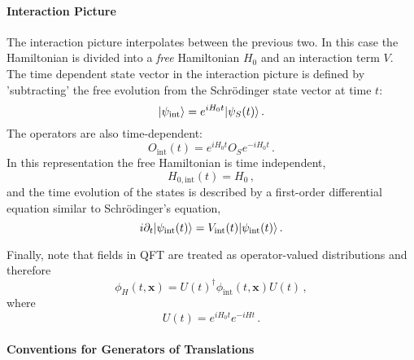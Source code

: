 \paragraph{Interaction Picture}

The interaction picture interpolates between the previous two. In this case the
Hamiltonian is divided into a {\it free} Hamiltonian $H_0$ and an interaction
term $V$. The time dependent state vector in the interaction picture is defined
by 'subtracting' the free evolution from the Schr\"odinger state vector at time
$t$:
\begin{equation}
    \label{eq:IntPictEvol}
    | \psi_{\mathrm{int}} \rangle = e^{i H_0 t} | \psi_S(t) \rangle\, .
\end{equation}
The operators are also time-dependent:
\begin{equation}
    \label{eq:IntPictOps}
    O_{\mathrm{int}}(t) = e^{i H_0 t} O_S e^{-i H_0 t}\, .
\end{equation}
In this representation the free Hamiltonian is time independent,
\begin{equation}
    \label{eq:H0IntPict}
    H_{0,\mathrm{int}}(t) = H_0\, ,
\end{equation}
and the time evolution of the states is described by a first-order differential
equation similar to Schr\"odinger's equation, 
\begin{equation}
    \label{eq:IntPictEvolEq}
    i \partial_t | \psi_{\mathrm{int}}(t) \rangle = V_{\mathrm{int}}(t) 
    | \psi_{\mathrm{int}}(t) \rangle\, .
\end{equation}

Finally, note that fields in QFT are treated as operator-valued distributions
and therefore
\begin{equation}
    \label{eq:HvIntFields}
    \phi_H(t,\mathbf{x}) = U(t)^\dagger \phi_{\mathrm{int}}(t,\mathbf{x}) 
    U(t)\, ,
\end{equation}
where
\begin{equation}
    \label{eq:Uoperator}
    U(t) = e^{iH_0t} e^{-iHt}\, .
\end{equation}

\paragraph{Conventions for Generators of Translations}

